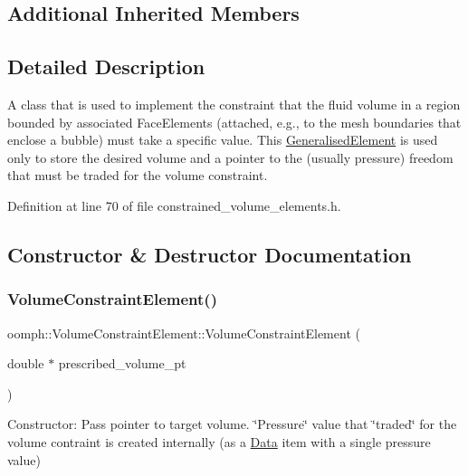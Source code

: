 \subsection*{Additional Inherited Members}


\subsection{Detailed Description}
A class that is used to implement the constraint that the fluid volume in a region bounded by associated Face\+Elements (attached, e.\+g., to the mesh boundaries that enclose a bubble) must take a specific value. This \hyperlink{classoomph_1_1GeneralisedElement}{Generalised\+Element} is used only to store the desired volume and a pointer to the (usually pressure) freedom that must be traded for the volume constraint. 

Definition at line 70 of file constrained\+\_\+volume\+\_\+elements.\+h.



\subsection{Constructor \& Destructor Documentation}
\mbox{\label{classoomph_1_1VolumeConstraintElement_a641eea5633b1ddd2d9f79e5731947660}} 
\subsubsection{\texorpdfstring{Volume\+Constraint\+Element()}{VolumeConstraintElement()}\hspace{0.1cm}{\footnotesize\ttfamily [1/2]}}
{\footnotesize\ttfamily oomph\+::\+Volume\+Constraint\+Element\+::\+Volume\+Constraint\+Element (\begin{DoxyParamCaption}\item[{double $\ast$}]{prescribed\+\_\+volume\+\_\+pt }\end{DoxyParamCaption})}



Constructor\+: Pass pointer to target volume. \char`\"{}\+Pressure\char`\"{} value that \char`\"{}traded\char`\"{} for the volume contraint is created internally (as a \hyperlink{classoomph_1_1Data}{Data} item with a single pressure value) 




